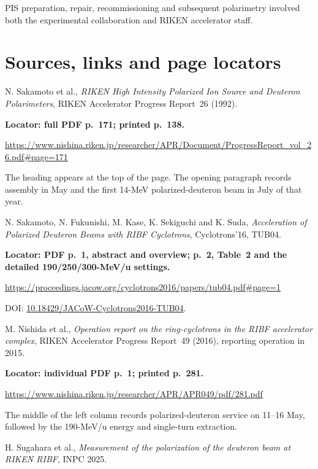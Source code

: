 \documentclass[11pt,a4paper]{article}
\begin{document}
PIS preparation, repair, recommissioning and subsequent polarimetry involved both the experimental collaboration and RIKEN accelerator staff.

\section{Sources, links and page locators}
\begin{enumerate}[label={\textbf{[\arabic*]}},leftmargin=2.7em,itemsep=0.8em]
\item N. Sakamoto et al., \emph{RIKEN High Intensity Polarized Ion Source and Deuteron Polarimeters}, RIKEN Accelerator Progress Report~26 (1992).

\textbf{Locator: full PDF p.~171; printed p.~138.}

\url{https://www.nishina.riken.jp/researcher/APR/Document/ProgressReport_vol_26.pdf#page=171}

The heading appears at the top of the page. The opening paragraph records assembly in May and the first 14-MeV polarized-deuteron beam in July of that year.

\item N. Sakamoto, N. Fukunishi, M. Kase, K. Sekiguchi and K. Suda, \emph{Acceleration of Polarized Deuteron Beams with RIBF Cyclotrons}, Cyclotrons'16, TUB04.

\textbf{Locator: PDF p.~1, abstract and overview; p.~2, Table~2 and the detailed 190/250/300-MeV/u settings.}

\url{https://proceedings.jacow.org/cyclotrons2016/papers/tub04.pdf#page=1}

DOI: \href{https://doi.org/10.18429/JACoW-Cyclotrons2016-TUB04}{10.18429/JACoW-Cyclotrons2016-TUB04}.

\item M. Nishida et al., \emph{Operation report on the ring-cyclotrons in the RIBF accelerator complex}, RIKEN Accelerator Progress Report~49 (2016), reporting operation in 2015.

\textbf{Locator: individual PDF p.~1; printed p.~281.}

\url{https://www.nishina.riken.jp/researcher/APR/APR049/pdf/281.pdf}

The middle of the left column records polarized-deuteron service on 11--16 May, followed by the 190-MeV/u energy and single-turn extraction.

\item H. Sugahara et al., \emph{Measurement of the polarization of the deuteron beam at RIKEN RIBF}, INPC 2025.


\end{enumerate}
\end{document}
